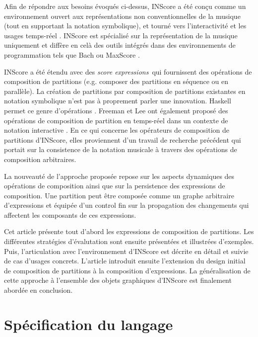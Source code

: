 \documentclass{article}
\newcommand{\sExprs}{\emph{score expressions}}
\begin{document}
Afin de répondre aux besoins évoqués ci-dessus, INScore \cite{Fober:12a,fober14c} a été conçu comme un environnement ouvert aux représentations non conventionnelles de la musique (tout en supportant la notation symbolique), et tourné vers l'interactivité et les usages temps-réel \cite{Fober:13b, Fober:14b}. INScore est spécialisé sur la représentation de la musique uniquement et diffère en celà des outils intégrés dans des environnements de programmation tels que Bach \cite{agostini12b} ou MaxScore \cite{didko08}. 

INScore a été étendu avec des \sExprs\ qui fournissent des opérations de composition de partitions (e.g. composer des partitions en séquence ou en parallèle). La création de partitions par composition de partitions existantes en notation symbolique n'est pas à proprement parler une innovation. Haskell permet ce genre d'opérations  \cite{Quick:2013:GAM:2505341.2505345}. Freeman et Lee ont également proposé des opérations de composition de partition en temps-réel dans un contexte de notation interactive \cite{Lee:2013}. En ce qui concerne les opérateurs de composition de partitions d'INScore, elles proviennent d'un travail de recherche précédent \cite{fober12b} qui portait sur la consistence de la notation musicale à travers des opérations de composition arbitraires.

La nouveauté de l'approche proposée repose sur les aspects dynamiques des opérations de composition ainsi que sur la persistence des expressions de composition. Une partition peut être composée comme un graphe arbitraire d'expressions et équipée d'un control fin sur la propagation des changements qui affectent les composants de ces expressions.

Cet article présente tout d'abord les expressions de composition de partitions. Les différentes stratégies d'évalutation sont ensuite présentées et illustrées d'exemples. Puis, l'articulation avec l'environnement d'INScore est décrite en détail et suivie de cas d'usages concrets. L'article introduit ensuite l'extension du design initial de composition de partitions à la composition d'expressions. La généralisation de cette approche à l'ensemble des objets graphiques d'INScore est finalement abordée en conclusion.


\section{Spécification du langage}\label{language}
\end{document}
